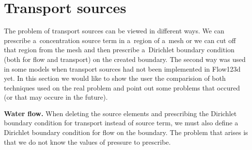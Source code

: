 \pagebreak

\clearpage



\clearpage

\section{Transport sources}
\label{sec:compare_sources}
The problem of transport sources can be viewed in different ways. We can prescribe a~concentration source term in a~region of a~mesh 
or we can cut off that region from the mesh and then prescribe a~Dirichlet boundary condition (both for flow and transport)
on the created boundary. The second way was used in some models when transport sources had not been implemented in Flow123d yet.
In this section we would like to show the user the comparision of both techniques used on the real problem and point out some problems
that occured (or that may occure in the future).

\textbf{Water flow.} When deleting the source elements and prescribing the Dirichlet boundary condition for transport instead 
of source term, we must also define a Dirichlet boundary condition for flow on the boundary. The problem that arises is that we 
do not know the values of pressure to prescribe. 

